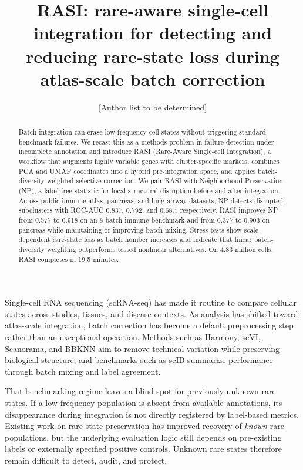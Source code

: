 \documentclass[10pt]{article}
\title{\textbf{RASI: rare-aware single-cell integration for detecting and reducing rare-state loss during atlas-scale batch correction}}
\author{[Author list to be determined]}
\date{}
\begin{document}
\maketitle

\begin{abstract}
Batch integration can erase low-frequency cell states without triggering standard benchmark failures. We recast this as a methods problem in failure detection under incomplete annotation and introduce RASI (Rare-Aware Single-cell Integration), a workflow that augments highly variable genes with cluster-specific markers, combines PCA and UMAP coordinates into a hybrid pre-integration space, and applies batch-diversity-weighted selective correction. We pair RASI with Neighborhood Preservation (NP), a label-free statistic for local structural disruption before and after integration. Across public immune-atlas, pancreas, and lung-airway datasets, NP detects disrupted subclusters with ROC-AUC 0.837, 0.792, and 0.687, respectively. RASI improves NP from 0.577 to 0.918 on an 8-batch immune benchmark and from 0.377 to 0.903 on pancreas while maintaining or improving batch mixing. Stress tests show scale-dependent rare-state loss as batch number increases and indicate that linear batch-diversity weighting outperforms tested nonlinear alternatives. On 4.83 million cells, RASI completes in 19.5 minutes.
\end{abstract}

Single-cell RNA sequencing (scRNA-seq) has made it routine to compare cellular states across studies, tissues, and disease contexts.\cite{regev2017,zheng2017} As analysis has shifted toward atlas-scale integration, batch correction has become a default preprocessing step rather than an exceptional operation.\cite{kang2024,tabula2022} Methods such as Harmony, scVI, Scanorama, and BBKNN aim to remove technical variation while preserving biological structure, and benchmarks such as scIB summarize performance through batch mixing and label agreement.\cite{korsunsky2019,lopez2018,hie2019,polanski2020,luecken2022}

That benchmarking regime leaves a blind spot for previously unknown rare states. If a low-frequency population is absent from available annotations, its disappearance during integration is not directly registered by label-based metrics. Existing work on rare-state preservation has improved recovery of \emph{known} rare populations, but the underlying evaluation logic still depends on pre-existing labels or externally specified positive controls.\cite{xiong2022,andreatta2021,zhao2024} Unknown rare states therefore remain difficult to detect, audit, and protect.
\end{document}

